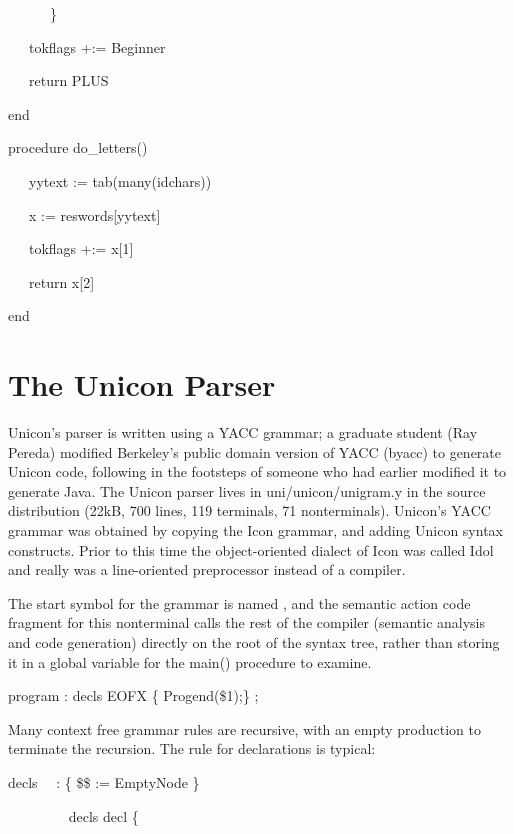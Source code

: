 {\ttfamily\mdseries
\ \ \ \ \ \ \}}

{\ttfamily\mdseries
\ \ \ tokflags +:= Beginner}

{\ttfamily\mdseries
\ \ \ return PLUS}

{\ttfamily\mdseries
end}


\bigskip

{\ttfamily\mdseries
procedure do\_letters()}

{\ttfamily\mdseries
\ \ \ yytext {\textbar}{\textbar}:= tab(many(idchars))}

{\ttfamily\mdseries
\ \ \ x := reswords[yytext]}

{\ttfamily\mdseries
\ \ \ tokflags +:= x[1]}

{\ttfamily\mdseries
\ \ \ return x[2]}

{\ttfamily\mdseries
end}

\section{The Unicon Parser}

Unicon's parser is written using a YACC grammar; a graduate student
(Ray Pereda) modified Berkeley's public domain version of YACC (byacc)
to generate Unicon code, following in the footsteps of someone who had
earlier modified it to generate Java. The Unicon parser lives in
uni/unicon/unigram.y in the source distribution (22kB, 700 lines, 119
terminals, 71 nonterminals). Unicon's YACC grammar was obtained by
copying the Icon grammar, and adding Unicon syntax constructs. Prior
to this time the object-oriented dialect of Icon was called Idol and
really was a line-oriented preprocessor instead of a compiler.

The start symbol for the grammar is named
, and the semantic action code fragment
for this nonterminal calls the rest of the compiler (semantic analysis
and code generation) directly on the root of the syntax tree, rather
than storing it in a global variable for the main() procedure to
examine.

{\ttfamily\mdseries
program : decls EOFX \{ Progend(\$1);\} ;}


Many context free grammar rules are recursive, with an empty
production to terminate the recursion. The rule for declarations is
typical:

{\ttfamily\mdseries
decls \ \ : \{ \$\$ := EmptyNode \}}

{\ttfamily\mdseries
\ \ \ \ \ \ \ \ {\textbar} decls decl \{}

